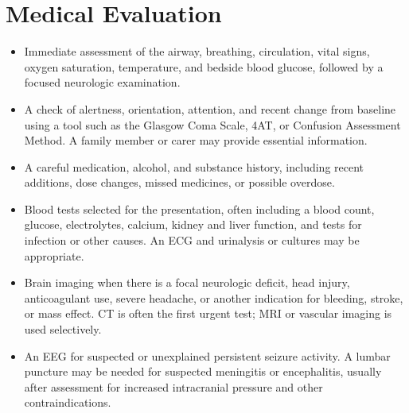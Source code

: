 \section*{Medical Evaluation}
\begin{itemize}
  \item Immediate assessment of the airway, breathing, circulation, vital signs, oxygen saturation, temperature, and bedside blood glucose, followed by a focused neurologic examination.
  \item A check of alertness, orientation, attention, and recent change from baseline using a tool such as the Glasgow Coma Scale, 4AT, or Confusion Assessment Method. A family member or carer may provide essential information.
  \item A careful medication, alcohol, and substance history, including recent additions, dose changes, missed medicines, or possible overdose.
  \item Blood tests selected for the presentation, often including a blood count, glucose, electrolytes, calcium, kidney and liver function, and tests for infection or other causes. An ECG and urinalysis or cultures may be appropriate.
  \item Brain imaging when there is a focal neurologic deficit, head injury, anticoagulant use, severe headache, or another indication for bleeding, stroke, or mass effect. CT is often the first urgent test; MRI or vascular imaging is used selectively.
  \item An EEG for suspected or unexplained persistent seizure activity. A lumbar puncture may be needed for suspected meningitis or encephalitis, usually after assessment for increased intracranial pressure and other contraindications.
\end{itemize}

